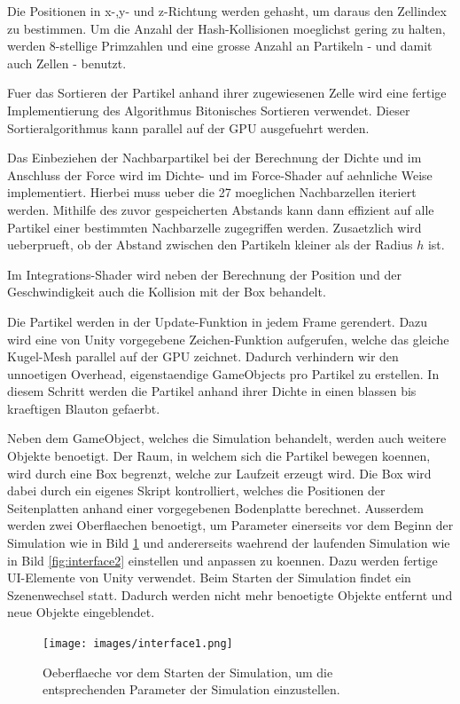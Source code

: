 \documentclass[a4paper]{paper}
\begin{document}
Die Positionen in x-,y- und z-Richtung werden gehasht, um daraus den Zellindex zu bestimmen. Um die Anzahl der Hash-Kollisionen moeglichst gering zu halten, werden 8-stellige Primzahlen und eine grosse Anzahl an Partikeln - und damit auch Zellen - benutzt.

Fuer das Sortieren der Partikel anhand ihrer zugewiesenen Zelle wird eine fertige Implementierung des Algorithmus Bitonisches Sortieren verwendet. Dieser Sortieralgorithmus kann parallel auf der GPU ausgefuehrt werden.

Das Einbeziehen der Nachbarpartikel bei der Berechnung der Dichte und im Anschluss der Force wird im Dichte- und im Force-Shader auf aehnliche Weise implementiert. Hierbei muss ueber die 27 moeglichen Nachbarzellen iteriert werden. Mithilfe des zuvor gespeicherten Abstands kann dann effizient auf alle Partikel einer bestimmten Nachbarzelle zugegriffen werden. Zusaetzlich wird ueberprueft, ob der Abstand zwischen den Partikeln kleiner als der Radius $h$ ist.

Im Integrations-Shader wird neben der Berechnung der Position und der Geschwindigkeit auch die Kollision mit der Box behandelt.

Die Partikel werden in der Update-Funktion in jedem Frame gerendert. Dazu wird eine von Unity vorgegebene Zeichen-Funktion aufgerufen, welche das gleiche Kugel-Mesh parallel auf der GPU zeichnet. Dadurch verhindern wir den unnoetigen Overhead, eigenstaendige GameObjects pro Partikel zu erstellen. In diesem Schritt werden die Partikel anhand ihrer Dichte in einen blassen bis kraeftigen Blauton gefaerbt.

Neben dem GameObject, welches die Simulation behandelt, werden auch weitere Objekte benoetigt. Der Raum, in welchem sich die Partikel bewegen koennen, wird durch eine Box begrenzt, welche zur Laufzeit erzeugt wird. Die Box wird dabei durch ein eigenes Skript kontrolliert, welches die Positionen der Seitenplatten anhand einer vorgegebenen Bodenplatte berechnet.
Ausserdem werden zwei Oberflaechen benoetigt, um Parameter einerseits vor dem Beginn der Simulation wie in Bild \ref{fig:interface1} und andererseits waehrend der laufenden Simulation wie in Bild \ref{fig:interface2} einstellen und anpassen zu koennen. Dazu werden fertige UI-Elemente von Unity verwendet. Beim Starten der Simulation findet ein Szenenwechsel statt. Dadurch werden nicht mehr benoetigte Objekte entfernt und neue Objekte eingeblendet.

\begin{figure}[t]
    \centering
    \texttt{[image: images/interface1.png]}
    \caption{Oeberflaeche vor dem Starten der Simulation, um die entsprechenden Parameter der Simulation einzustellen.}
    \label{fig:interface1}
\end{figure}
\end{document}
